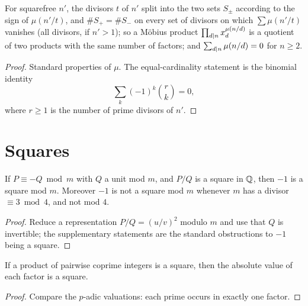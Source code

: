 \begin{lemma}
  \label{lem:moebiussign}
  \leanok
  For squarefree $n'$, the divisors $t$ of $n'$ split into the two sets $S_\pm$ according to
  the sign of $\mu(n'/t)$, and $\#S_+ = \#S_-$ on every set of divisors on which
  $\sum \mu(n'/t)$ vanishes (all divisors, if $n' > 1$); so a Möbius product
  $\prod_{d \mathrel{\mid} n} x_d^{\mu(n/d)}$ is a quotient of two products with the same number of
  factors; and $\sum_{d \mathrel{\mid} n} \mu(n/d) = 0$ for $n \ge 2$.
\end{lemma}
\begin{proof}
  \leanok
  Standard properties of $\mu$. The equal-cardinality statement is the binomial identity
  \[ \sum_{k} (-1)^k \binom{r}{k} = 0, \]
  where $r \ge 1$ is the number of prime divisors of $n'$.
\end{proof}

\section{Squares}

\begin{lemma}
  \label{lem:zmodsquare}
  \leanok
  If $P \equiv -Q \bmod m$ with $Q$ a unit mod $m$, and $P/Q$ is a square in $\mathbb{Q}$, then $-1$ is
  a square mod $m$. Moreover $-1$ is not a square mod $m$ whenever $m$ has a divisor
  $\equiv 3 \bmod 4$, and not mod $4$.
\end{lemma}
\begin{proof}
  \leanok
  Reduce a representation $P/Q = (u/v)^2$ modulo $m$ and use that $Q$ is invertible; the
  supplementary statements are the standard obstructions to $-1$ being a square.
\end{proof}

\begin{lemma}
  \label{lem:coprimesquare}
  \leanok
  If a product of pairwise coprime integers is a square, then the absolute value of each factor
  is a square.
\end{lemma}
\begin{proof}
  \leanok
  Compare the $p$-adic valuations: each prime occurs in exactly one factor.
\end{proof}
